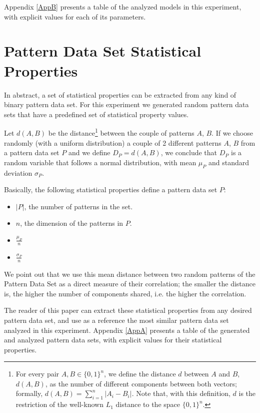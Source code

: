 \documentclass[anon]{CI}
\begin{document}
Appendix \ref{AppB} presents a table of the analyzed models in this experiment, with explicit values for each of its parameters.


\section{Pattern Data Set Statistical Properties}

In abstract, a set of statistical properties can be extracted from any kind of binary pattern data set. For this experiment we generated random pattern data sets that have a predefined set of statistical property values.

Let $d(A, B)$ be the distance\footnote{For every pair $A,B \in \{0,1\}^n$, we define the distance $d$ between $A$ and $B$, $d(A,B)$, as the number of different components between both vectors; formally, $d(A,B) = \sum_{i=1}^{n} |A_i - B_i|$. Note that, with this definition, $d$ is the restriction of the well-known $L_1$ distance to the space $\{0,1\}^n$.} between the couple of patterns $A$, $B$. If we choose randomly (with a uniform distribution) a couple of 2 different patterns $A$, $B$ from a pattern data set $P$ and we define $D_P=d(A, B)$, we conclude that $D_P$ is a random variable that follows a normal distribution, with mean $\mu_P$ and standard deviation $\sigma_P$.
	
Basically, the following statistical properties define a pattern data set $P$:
\begin{itemize}
	\item $\left|P\right|$, the number of patterns in the set.
	\item $n$, the dimension of the patterns in $P$. 
	\item $\frac{\mu_P}{n}$
	\item $\frac{\sigma_P}{n}$
\end{itemize}
	
We point out that we use this mean distance between two random patterns of the Pattern Data Set as a direct measure of their correlation; the smaller the distance is, the higher the number of components shared, i.e. the higher the correlation. 

The reader of this paper can extract these statistical properties from any desired pattern data set, and use as a reference the most similar pattern data set analyzed in this experiment. Appendix \ref{AppA} presents a table of the generated and analyzed pattern data sets, with explicit values for their statistical properties.
\end{document}
